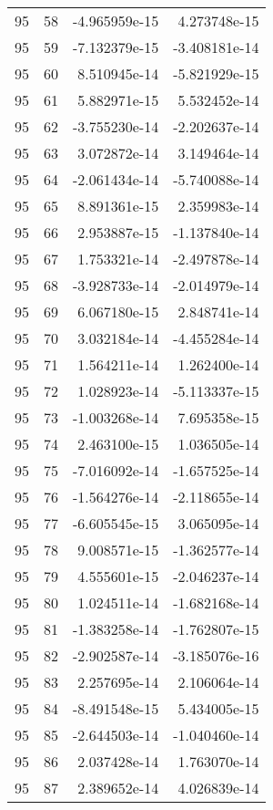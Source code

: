 \begin{tabular}{rrrr}
  95 &   58 & -4.965959e-15 &  4.273748e-15 \\
  95 &   59 & -7.132379e-15 & -3.408181e-14 \\
  95 &   60 &  8.510945e-14 & -5.821929e-15 \\
  95 &   61 &  5.882971e-15 &  5.532452e-14 \\
  95 &   62 & -3.755230e-14 & -2.202637e-14 \\
  95 &   63 &  3.072872e-14 &  3.149464e-14 \\
  95 &   64 & -2.061434e-14 & -5.740088e-14 \\
  95 &   65 &  8.891361e-15 &  2.359983e-14 \\
  95 &   66 &  2.953887e-15 & -1.137840e-14 \\
  95 &   67 &  1.753321e-14 & -2.497878e-14 \\
  95 &   68 & -3.928733e-14 & -2.014979e-14 \\
  95 &   69 &  6.067180e-15 &  2.848741e-14 \\
  95 &   70 &  3.032184e-14 & -4.455284e-14 \\
  95 &   71 &  1.564211e-14 &  1.262400e-14 \\
  95 &   72 &  1.028923e-14 & -5.113337e-15 \\
  95 &   73 & -1.003268e-14 &  7.695358e-15 \\
  95 &   74 &  2.463100e-15 &  1.036505e-14 \\
  95 &   75 & -7.016092e-14 & -1.657525e-14 \\
  95 &   76 & -1.564276e-14 & -2.118655e-14 \\
  95 &   77 & -6.605545e-15 &  3.065095e-14 \\
  95 &   78 &  9.008571e-15 & -1.362577e-14 \\
  95 &   79 &  4.555601e-15 & -2.046237e-14 \\
  95 &   80 &  1.024511e-14 & -1.682168e-14 \\
  95 &   81 & -1.383258e-14 & -1.762807e-15 \\
  95 &   82 & -2.902587e-14 & -3.185076e-16 \\
  95 &   83 &  2.257695e-14 &  2.106064e-14 \\
  95 &   84 & -8.491548e-15 &  5.434005e-15 \\
  95 &   85 & -2.644503e-14 & -1.040460e-14 \\
  95 &   86 &  2.037428e-14 &  1.763070e-14 \\
  95 &   87 &  2.389652e-14 &  4.026839e-14 \\

\end{tabular}
